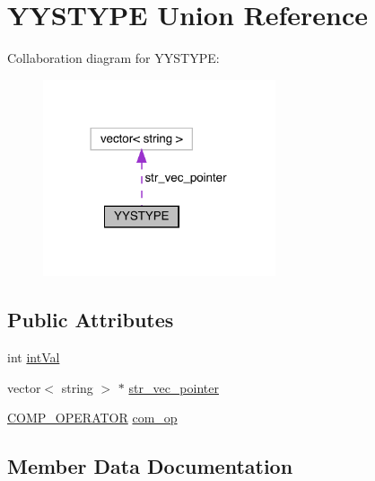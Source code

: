 \hypertarget{union_y_y_s_t_y_p_e}{}\section{Y\+Y\+S\+T\+Y\+PE Union Reference}
\label{union_y_y_s_t_y_p_e}


Collaboration diagram for Y\+Y\+S\+T\+Y\+PE\+:
\nopagebreak
\begin{figure}[H]
\begin{center}
\leavevmode
\includegraphics[width=194pt]{union_y_y_s_t_y_p_e__coll__graph}
\end{center}
\end{figure}
\subsection*{Public Attributes}
\begin{DoxyCompactItemize}
\item 
int \mbox{\hyperlink{union_y_y_s_t_y_p_e_a83ee412e29e20041c84ddb8ffa14b10c}{int\+Val}}
\item 
vector$<$ string $>$ $\ast$ \mbox{\hyperlink{union_y_y_s_t_y_p_e_a34f9f4734b6cc1f517f09040e563271e}{str\+\_\+vec\+\_\+pointer}}
\item 
\mbox{\hyperlink{namespacegraphsat_acfb5939f9bdafbd9aea0d084b9a56f69}{C\+O\+M\+P\+\_\+\+O\+P\+E\+R\+A\+T\+OR}} \mbox{\hyperlink{union_y_y_s_t_y_p_e_a62cb5c0735e9913dbca9de8fe329dcb4}{com\+\_\+op}}
\end{DoxyCompactItemize}


\subsection{Member Data Documentation}
\mbox{\label{union_y_y_s_t_y_p_e_a62cb5c0735e9913dbca9de8fe329dcb4}} 
